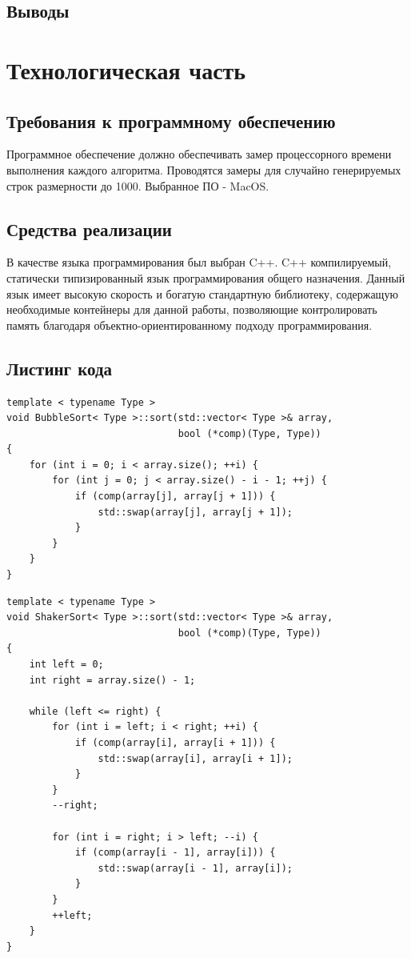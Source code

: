 \documentclass[a4paper,12pt]{article}
\begin{document}
\subsection{Выводы}

\newpage
\section{Технологическая часть}

\subsection{Требования к программному обеспечению}

Программное обеспечение должно обеспечивать замер процессорного времени
выполнения каждого алгоритма. Проводятся замеры для случайно генерируемых
строк размерности до 1000. Выбранное ПО - MacOS.

\subsection{Средства реализации}

В качестве языка программирования был выбран C++. C++ компилируемый,
статически типизированный язык программирования общего назначения.
Данный язык имеет высокую скорость и богатую стандартную библиотеку,
содержащую необходимые контейнеры для данной работы, позволяющие
контролировать память благодаря объектно-ориентированному подходу
программирования.

\subsection{Листинг кода}

\begin{lstlisting}[caption=Сортировка пузырьком]
template < typename Type >
void BubbleSort< Type >::sort(std::vector< Type >& array,
                              bool (*comp)(Type, Type))
{
    for (int i = 0; i < array.size(); ++i) {
        for (int j = 0; j < array.size() - i - 1; ++j) {
            if (comp(array[j], array[j + 1])) {
                std::swap(array[j], array[j + 1]);
            }
        }
    }
}
\end{lstlisting}

\begin{lstlisting}[caption=Сортировка шейкером]
template < typename Type >
void ShakerSort< Type >::sort(std::vector< Type >& array,
                              bool (*comp)(Type, Type))
{
    int left = 0;
    int right = array.size() - 1;

    while (left <= right) {
        for (int i = left; i < right; ++i) {
            if (comp(array[i], array[i + 1])) {
                std::swap(array[i], array[i + 1]);
            }
        }
        --right;

        for (int i = right; i > left; --i) {
            if (comp(array[i - 1], array[i])) {
                std::swap(array[i - 1], array[i]);
            }
        }
        ++left;
    }
}
\end{lstlisting}
\end{document}
